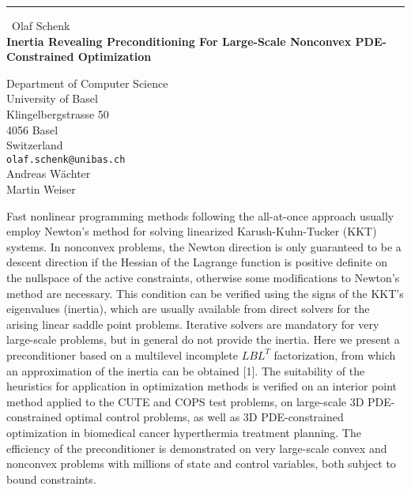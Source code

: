\documentclass{report}
\begin{document}
\begin{center}
\rule{6in}{1pt} \
{\large Olaf Schenk \\
{\bf Inertia Revealing Preconditioning For Large-Scale Nonconvex PDE-Constrained Optimization }}

Department of Computer Science \\ University of Basel \\ Klingelbergstrasse 50 \\ 4056 Basel \\ Switzerland
\\
{\tt olaf.schenk@unibas.ch}\\
Andreas W\"achter\\
Martin Weiser\end{center}

Fast nonlinear programming methods following the all-at-once approach
usually employ Newton's method for solving linearized Karush-Kuhn-Tucker
(KKT) systems. In nonconvex problems, the Newton direction is only
guaranteed to be a descent direction if the Hessian of the Lagrange function
is positive definite on the nullspace of the active constraints, otherwise
some modifications to Newton's method are necessary. This condition can be
verified using the signs of the KKT's eigenvalues (inertia), which are
usually available from direct solvers for the arising linear saddle point
problems. Iterative solvers are mandatory for very large-scale problems,
but in general do not provide the inertia. Here we present a preconditioner
based on a multilevel incomplete $LBL^T$ factorization, from which an
approximation of the inertia can be obtained [1]. The suitability of the
heuristics for application in optimization methods is verified on an
interior point method applied to the CUTE and COPS test problems, on
large-scale 3D PDE-constrained optimal control problems, as well as 3D
PDE-constrained optimization in biomedical cancer hyperthermia treatment
planning. The efficiency of the preconditioner is demonstrated on very
large-scale convex and nonconvex problems with millions of state and control
variables, both subject to bound constraints.
\end{document}
